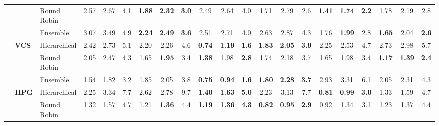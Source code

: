 \documentclass{ieeeaccess}
\begin{document}
{\begin{longtable}{@{\extracolsep{\fill}}lllccc|ccc|ccc|ccc|ccc|ccc}
 &  & Round Robin & 2.57 & 2.67 & 4.1 & \textbf{1.88} & \textbf{2.32} & \textbf{3.0} & \cellcolor{colorrr}2.49 & \cellcolor{colorrr}2.64 & \cellcolor{colorrr}4.0 & \cellcolor{colorrr}1.71 & \cellcolor{colorrr}2.79 & \cellcolor{colorrr}2.6 & \cellcolor{colorrr}\textbf{1.41} & \cellcolor{colorrr}\textbf{1.74} & \cellcolor{colorrr}\textbf{2.2} & 1.78 & 2.19 & 2.8 \\
 &  & Ensemble & 3.07 & 3.49 & 4.9 & \textbf{2.24} & \textbf{2.49} & \textbf{3.6} & 2.51 & 2.71 & \cellcolor{colorens}4.0 & 2.63 & 2.87 & 4.3 & 1.76 & \textbf{1.99} & 2.8 & \cellcolor{colorens}\textbf{1.65} & \cellcolor{colorens}2.04 & \cellcolor{colorens}\textbf{2.6} \\
\cmidrule(lr){2-21}
 & \multirow{3}{*}{\textbf{VCS}} & Hierarchical & 2.42 & 2.73 & 5.1 & 2.20 & 2.26 & 4.6 & \cellcolor{colorhier}\textbf{0.74} & \textbf{1.19} & \cellcolor{colorhier}\textbf{1.6} & \textbf{1.83} & \cellcolor{colorhier}\textbf{2.05} & \textbf{3.9} & 2.25 & 2.53 & 4.7 & 2.73 & 2.98 & 5.7 \\
 &  & Round Robin & 2.05 & 2.47 & 4.3 & \cellcolor{colorrr}1.65 & \cellcolor{colorrr}\textbf{1.95} & \cellcolor{colorrr}3.4 & \textbf{1.38} & 1.98 & \textbf{2.8} & \cellcolor{colorrr}1.74 & 2.18 & \cellcolor{colorrr}3.7 & \cellcolor{colorrr}1.65 & \cellcolor{colorrr}1.98 & \cellcolor{colorrr}3.4 & \cellcolor{colorrr}\textbf{1.17} & \cellcolor{colorrr}\textbf{1.39} & \cellcolor{colorrr}\textbf{2.4} \\
 &  & Ensemble & \cellcolor{colorens}1.54 & \cellcolor{colorens}1.82 & \cellcolor{colorens}3.2 & 1.85 & 2.05 & 3.8 & \textbf{0.75} & \cellcolor{colorens}\textbf{0.94} & \cellcolor{colorens}\textbf{1.6} & \textbf{1.80} & \textbf{2.28} & \cellcolor{colorens}\textbf{3.7} & 2.93 & 3.31 & 6.1 & 2.05 & 2.31 & 4.3 \\
\cmidrule(lr){2-21}
 & \multirow{3}{*}{\textbf{HPG}} & Hierarchical & 2.25 & 3.34 & 7.7 & 2.62 & 2.78 & 9.7 & \textbf{1.40} & \textbf{1.63} & \textbf{5.0} & 2.23 & 3.13 & 7.7 & \cellcolor{colorhier}\textbf{0.81} & \cellcolor{colorhier}\textbf{0.99} & \cellcolor{colorhier}\textbf{3.0} & 1.33 & 1.59 & 4.7 \\
 &  & Round Robin & \cellcolor{colorrr}1.32 & \cellcolor{colorrr}1.57 & \cellcolor{colorrr}4.7 & 1.21 & \textbf{1.36} & 4.4 & \cellcolor{colorrr}\textbf{1.19} & \cellcolor{colorrr}\textbf{1.36} & \cellcolor{colorrr}\textbf{4.3} & \cellcolor{colorrr}\textbf{0.82} & \cellcolor{colorrr}\textbf{0.95} & \cellcolor{colorrr}\textbf{2.9} & 0.92 & 1.34 & 3.1 & 1.23 & \cellcolor{colorrr}1.37 & 4.4 \\

\end{longtable}}
\end{document}
